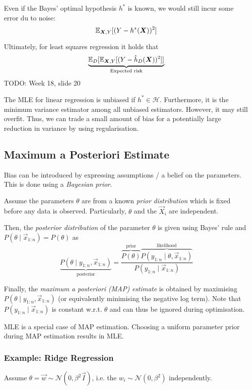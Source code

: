 Even if the Bayes' optimal hypothesis $h^*$ is
known, we would still incur some error du to noise:
\begin{equation*}
\mathbb{E}_{\boldsymbol{X}, Y}[
(Y - h^*(\boldsymbol{X}))^2
]
\end{equation*}

Ultimately, for least squares regression it holds that
\begin{align*}
\underbrace{\mathbb{E}_D[\mathbb{E}_{\boldsymbol{X}, Y}[
	(Y - \hat{h}_D(\boldsymbol{X}))^2
	]]}_{\text{Expected risk}}
\end{align*}
TODO: Week 18, slide 20

The MLE for linear regression is unbiased
if $h^* \in \mathcal{H}$.
Furthermore, it is the minimum variance
estimator among all unbiased estimators.
However, it may still overfit.
Thus, we can trade a small amount of bias
for a potentially large reduction in variance
by using regularisation.


\subsection{Maximum a Posteriori Estimate}
Bias can be introduced by expressing assumptions / a belief
on the parameters.
This is done using a \emph{Bayesian prior}.

Assume the parameters $\theta$ are from a known
\emph{prior distribution} which is fixed before any data
is observed.
Particularly, $\theta$ and the $\vec{X}_i$ are independent.

Then, the \emph{posterior distribution} of the parameter
$\theta$ is given using Bayes' rule
and $P(\theta \mid \vec{x}_{1:n}) = P(\theta)$ as
\begin{equation*}
\underbrace{
	P(\theta \mid y_{1:n}, \vec{x}_{1:n})}_\text{posterior}
= \frac{
	\overbrace{P(\theta)}^\text{prior}
	\overbrace{
		P(y_{1:n} \mid \theta, \vec{x}_{1:n})}^\text{likelihood}
}{
	P(y_{1:n} \mid \vec{x}_{1:n})
}
\end{equation*}

Finally, the \emph{maximum a posteriori (MAP) estimate}
is obtained by maximising $P(\theta \mid y_{1:n}, \vec{x}_{1:n})$
(or equivalently minimising the negative log term).
Note that $P(y_{1:n} \mid \vec{x}_{1:n})$ is constant w.r.t.
$\theta$ and can thus be ignored during optimisation.

MLE is a special case of MAP estimation.
Choosing a uniform parameter prior during
MAP estimation results in MLE.


\subsubsection{Example: Ridge Regression}
Assume $\theta = \vec{w} \sim \mathcal{N}(0, \beta^2 \vec{I})$,
i.e. the $w_i \sim \mathcal{N}(0, \beta^2)$ independently.

